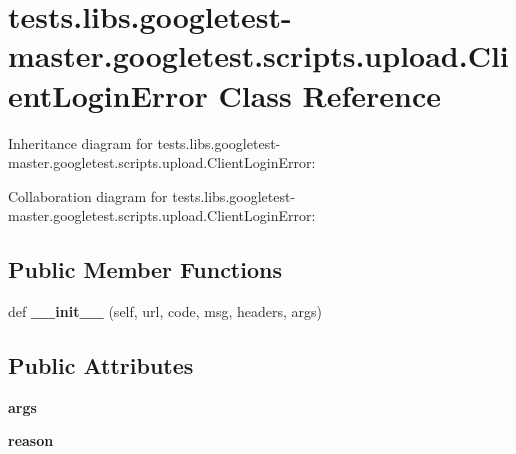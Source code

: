 \hypertarget{classtests_1_1libs_1_1googletest-master_1_1googletest_1_1scripts_1_1upload_1_1ClientLoginError}{}\section{tests.\+libs.\+googletest-\/master.googletest.\+scripts.\+upload.\+Client\+Login\+Error Class Reference}
\label{classtests_1_1libs_1_1googletest-master_1_1googletest_1_1scripts_1_1upload_1_1ClientLoginError}


Inheritance diagram for tests.\+libs.\+googletest-\/master.googletest.\+scripts.\+upload.\+Client\+Login\+Error\+:


Collaboration diagram for tests.\+libs.\+googletest-\/master.googletest.\+scripts.\+upload.\+Client\+Login\+Error\+:
\subsection*{Public Member Functions}
\begin{DoxyCompactItemize}
\item 
\mbox{\label{classtests_1_1libs_1_1googletest-master_1_1googletest_1_1scripts_1_1upload_1_1ClientLoginError_a65c2620fd7249b9090809819c937df02}} 
def {\bfseries \+\_\+\+\_\+init\+\_\+\+\_\+} (self, url, code, msg, headers, args)
\end{DoxyCompactItemize}
\subsection*{Public Attributes}
\begin{DoxyCompactItemize}
\item 
\mbox{\label{classtests_1_1libs_1_1googletest-master_1_1googletest_1_1scripts_1_1upload_1_1ClientLoginError_af69319a4b0fd0010900eaf3b9b3ff3a6}} 
{\bfseries args}
\item 
\mbox{\label{classtests_1_1libs_1_1googletest-master_1_1googletest_1_1scripts_1_1upload_1_1ClientLoginError_a0cd48031f21531830c6b89b23f526f52}} 
{\bfseries reason}
\end{DoxyCompactItemize}


